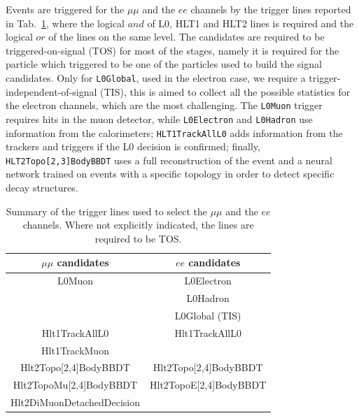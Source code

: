 Events are triggered for the $\mu\mu$ and the $ee$ channels by the trigger lines
reported in Tab.~\ref{tab:RKst_triglines}, where the logical $and$ of L0, HLT1 and HLT2
lines is required and the logical $or$ of the lines on the same level. The candidates are
required to be triggered-on-signal (TOS) for most of the stages, namely
it is required for the particle which triggered to be one of the particles used to build the signal candidates.
Only for \verb!L0Global!, used in the electron case, we require a trigger-independent-of-signal (TIS),
this is aimed to collect all the possible statistics for the electron channels, which are the most challenging.
The \verb!L0Muon! trigger requires hits in the muon detector, while \verb!L0Electron! and \verb!L0Hadron! use information
from the calorimeters; \verb!HLT1TrackAllL0! adds information from the trackers and
triggers if the L0 decision is confirmed; finally, \verb!HLT2Topo[2,3]BodyBBDT! uses a full reconstruction 
of the event and a neural network trained on events with a specific topology in order to detect specific decay structures.

\begin{table}[h!]
\begin{center}
\caption{Summary of the trigger lines used to select the $\mu\mu$ and the $ee$ channels.
Where not explicitly indicated, the lines are required to be TOS.}
\begin{tabular}{c|c}
$\mu\mu$ candidates &  $ee$ candidates \\
\hline
	L0Muon		& L0Electron\\
				& L0Hadron\\
				& L0Global (TIS)\\
\hline
	Hlt1TrackAllL0				& Hlt1TrackAllL0 \\
	Hlt1TrackMuon				&	 \\
\hline
	Hlt2Topo[2,4]BodyBBDT 		& Hlt2Topo[2,4]BodyBBDT \\
	Hlt2TopoMu[2,4]BodyBBDT 	& Hlt2TopoE[2,4]BodyBBDT \\
	Hlt2DiMuonDetachedDecision	&							\\
\end{tabular}
\label{tab:RKst_triglines}
\end{center}
\end{table}

